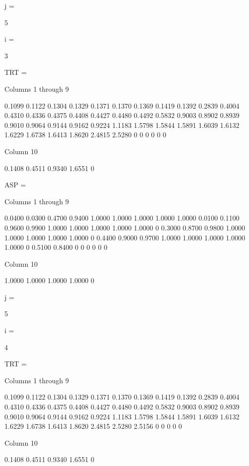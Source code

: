 j =

     5


i =

     3


TRT =

  Columns 1 through 9

    0.1099    0.1122    0.1304    0.1329    0.1371    0.1370    0.1369    0.1419    0.1392
    0.2839    0.4004    0.4310    0.4336    0.4375    0.4408    0.4427    0.4480    0.4492
    0.5832    0.9003    0.8902    0.8939    0.9010    0.9064    0.9144    0.9162    0.9224
    1.1183    1.5798    1.5844    1.5891    1.6039    1.6132    1.6229    1.6738    1.6413
    1.8620    2.4815    2.5280         0         0         0         0         0         0

  Column 10

    0.1408
    0.4511
    0.9340
    1.6551
         0


ASP =

  Columns 1 through 9

    0.0400    0.0300    0.4700    0.9400    1.0000    1.0000    1.0000    1.0000    1.0000
    0.0100    0.1100    0.9600    0.9900    1.0000    1.0000    1.0000    1.0000    1.0000
         0    0.3000    0.8700    0.9800    1.0000    1.0000    1.0000    1.0000    1.0000
         0    0.4400    0.9000    0.9700    1.0000    1.0000    1.0000    1.0000    1.0000
         0    0.5100    0.8400         0         0         0         0         0         0

  Column 10

    1.0000
    1.0000
    1.0000
    1.0000
         0


j =

     5


i =

     4


TRT =

  Columns 1 through 9

    0.1099    0.1122    0.1304    0.1329    0.1371    0.1370    0.1369    0.1419    0.1392
    0.2839    0.4004    0.4310    0.4336    0.4375    0.4408    0.4427    0.4480    0.4492
    0.5832    0.9003    0.8902    0.8939    0.9010    0.9064    0.9144    0.9162    0.9224
    1.1183    1.5798    1.5844    1.5891    1.6039    1.6132    1.6229    1.6738    1.6413
    1.8620    2.4815    2.5280    2.5156         0         0         0         0         0

  Column 10

    0.1408
    0.4511
    0.9340
    1.6551
         0


